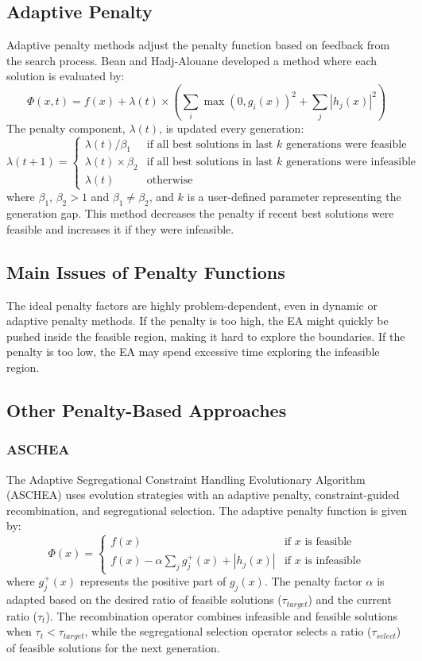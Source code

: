 \subsection*{Adaptive Penalty}

Adaptive penalty methods adjust the penalty function based on feedback from the search process. Bean and Hadj-Alouane developed a method where each solution is evaluated by:
\[\Phi(x, t) = f(x) + \lambda(t) \times  \left(\sum_i \max(0, g_i(x))^2 + \sum_j |h_j(x)|^2 \right)\]
The penalty component, \(\lambda(t)\), is updated every generation:
\[ \lambda(t+1) =
\begin{cases}
    \lambda(t) / \beta_1 & \text{if all best solutions in last } k \text{ generations were feasible} \\
    \lambda(t) \times \beta_2 & \text{if all best solutions in last } k \text{ generations were infeasible} \\
    \lambda(t) & \text{otherwise}
\end{cases}
\]
where \(\beta_1\), \(\beta_2 > 1\) and \(\beta_1 \neq \beta_2\), and \(k\) is a user-defined parameter representing the generation gap.  This method decreases the penalty if recent best solutions were feasible and increases it if they were infeasible.

\subsection*{Main Issues of Penalty Functions}

The ideal penalty factors are highly problem-dependent, even in dynamic or adaptive penalty methods. If the penalty is too high, the EA might quickly be pushed inside the feasible region, making it hard to explore the boundaries.  If the penalty is too low, the EA may spend excessive time exploring the infeasible region.

\subsection*{Other Penalty-Based Approaches}

\subsubsection*{ASCHEA}
The Adaptive Segregational Constraint Handling Evolutionary Algorithm (ASCHEA) uses evolution strategies with an adaptive penalty, constraint-guided recombination, and segregational selection. The adaptive penalty function is given by:
\[
\Phi(x) =
\begin{cases}
    f(x) & \text{if } x \text{ is feasible} \\
    f(x) - \alpha \sum_j g_j^+(x) + |h_j(x)|  & \text{if } x \text{ is infeasible}
\end{cases}
\]
where \(g_j^+(x)\) represents the positive part of \(g_j(x)\). The penalty factor \(\alpha\) is adapted based on the desired ratio of feasible solutions (\(\tau_{target}\)) and the current ratio (\(\tau_t\)). The recombination operator combines infeasible and feasible solutions when \(\tau_t < \tau_{target}\), while the segregational selection operator selects a ratio (\(\tau_{select}\)) of feasible solutions for the next generation.

